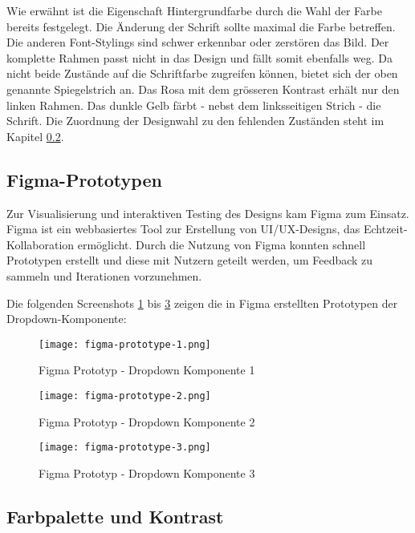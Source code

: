 Wie erwähnt ist die Eigenschaft Hintergrundfarbe durch die Wahl der Farbe bereits festgelegt. 
Die Änderung der Schrift sollte maximal die Farbe betreffen. 
Die anderen Font-Stylings sind schwer erkennbar oder zerstören das Bild.
Der komplette Rahmen passt nicht in das Design und fällt somit ebenfalls weg.
Da nicht beide Zustände auf die Schriftfarbe zugreifen können, bietet sich der oben genannte Spiegelstrich an.
Das Rosa mit dem grösseren Kontrast erhält nur den linken Rahmen.
Das dunkle Gelb färbt - nebst dem linksseitigen Strich - die Schrift.
Die Zuordnung der Designwahl zu den fehlenden Zuständen steht im Kapitel \ref{sec:colorContrast}.


\clearpage
\subsection{Figma-Prototypen}
\label{sec:figmaPrototype}

Zur Visualisierung und interaktiven Testing des Designs kam Figma zum Einsatz. 
Figma ist ein webbasiertes Tool zur Erstellung von UI/UX-Designs, das Echtzeit-Kollaboration ermöglicht. 
Durch die Nutzung von Figma konnten schnell Prototypen erstellt und diese mit Nutzern geteilt werden, um Feedback zu sammeln und Iterationen vorzunehmen.

Die folgenden Screenshots \ref{img:figmaPrototype1} bis \ref{img:figmaPrototype3} zeigen die in Figma erstellten Prototypen der Dropdown-Komponente:

\begin{figure}[!htb]
    \centering
    \texttt{[image: figma-prototype-1.png]}
    \caption{Figma Prototyp - Dropdown Komponente 1}
    \label{img:figmaPrototype1}
\end{figure}

\begin{figure}[!htb]
    \centering
    \texttt{[image: figma-prototype-2.png]}
    \caption{Figma Prototyp - Dropdown Komponente 2}
    \label{img:figmaPrototype2}
\end{figure}

\begin{figure}[!htb]
    \centering
    \texttt{[image: figma-prototype-3.png]}
    \caption{Figma Prototyp - Dropdown Komponente 3}
    \label{img:figmaPrototype3}
\end{figure}


\subsection{Farbpalette und Kontrast}
\label{sec:colorContrast}

